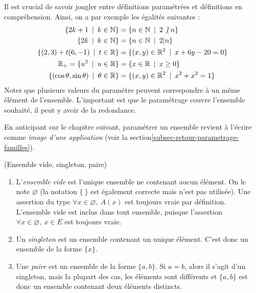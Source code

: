 \begin{exemple}
Il est crucial de savoir jongler entre définitions paramétrées et définitions en compréhension. Ainsi, on a par exemple les égalités suivantes :
\begin{align*}
\left\{2k+1 \:\mid\: k\in \N\right\}  &= \left\{ n\in \N\:\mid\: 2\not|\: n\right\} \\
\left\{2k \:\mid\: k\in \N\right\} &=  \left\{ n\in \N\:\mid\: 2| n\right\}\\
\{ (2,3)+t(6,-1)\:\mid\: t\in \R\} &= \{(x,y)\in \R^2\:\mid\: x+6y-20=0\}\\
\R_+ = \{u^2\:\mid\: u\in \R\} & = \{x\in \R\:\mid\: x\geq 0\}\\
\{(\cos\theta,\sin\theta)\:\mid\: \theta\in \R\} &= \{(x,y)\in \R^2\:\mid\: x^2+x^2=1\}  
\end{align*}
Noter que plusieurs valeurs du paramètre peuvent correspondre à un même élément de l'ensemble. L'important est que le paramétrage \og couvre\fg{} l'ensemble souhaité, il peut y avoir de la redondance.
\end{exemple}

\begin{remarque}
En anticipant sur le chapitre suivant, paramétrer un ensemble revient à l'écrire comme \emph{image d'une application} (voir la section\ref{subsec-retour-parametrage-familles}).
\end{remarque}


\begin{definition}(Ensemble vide, singleton, paire)
\begin{enumerate}
\item L'\emph{ensemble vide} est l'unique ensemble ne contenant aucun élément. On le note $\varnothing$ (la notation $\{\:\}$ est également correcte mais n'est pas utilisée). Une assertion du type \og $\forall x\in \varnothing, \: A(x)$\fg{} est toujours vraie par définition. L'ensemble vide est inclus dans tout ensemble, puisque l'assertion \og $\forall x\in \varnothing, \: x\in E$\fg{} est toujours vraie.
\item Un \emph{singleton} est un ensemble contenant un unique élément. C'est donc un ensemble de la forme $\{x\}$.
\item Une \emph{paire} est un ensemble de la forme $\{a,b\}$. Si $a=b$, alors il s'agit d'un singleton, mais la plupart des cas, les éléments sont différents et $\{a,b\}$ est donc un ensemble contenant deux éléments distincts.
\end{enumerate}
\end{definition}

